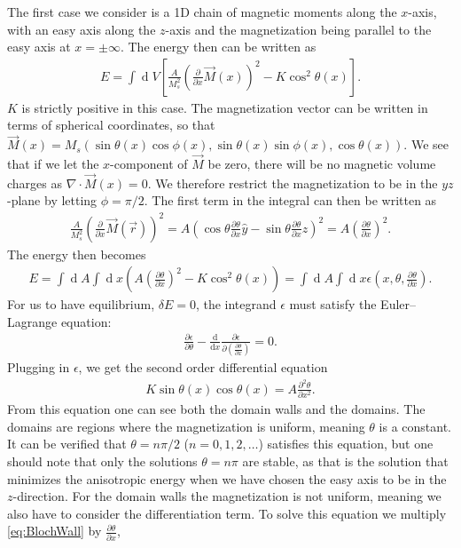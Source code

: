 \documentclass[12pt, a4paper, twoside, openright]{article}		%
\renewcommand{\d}[1]{\ensuremath{\operatorname{d}\!{#1}}}
\numberwithin{equation}{section}
\begin{document}
The first case we consider is a 1D chain of magnetic moments along the $x$-axis, with an easy axis along the $z$-axis and the magnetization being parallel to the easy axis at $x = \pm \infty$. The energy then can be written as
\begin{align}
\label{eq:BlochEnergy}
E = \int \d V \left[\frac{A}{M_s^2}\left(\frac{\partial}{\partial x}\vec{M}(x)\right)^2 - K \cos ^2 \theta (x)\right].
\end{align}
$K$ is strictly positive in this case. The magnetization vector can be written in terms of spherical coordinates, so that $\vec{M}(x) = M_s (\sin \theta (x) \cos \phi (x), \sin \theta (x) \sin \phi (x), \cos \theta (x))$. We see that if we let the $x$-component of $\vec{M}$ be zero, there will be no magnetic volume charges as $\nabla \cdot \vec{M}(x) = 0$. We therefore restrict the magnetization to be in the $yz$-plane by letting $\phi = \pi/2$. The first term in the integral can then be written as
\begin{align}
\frac{A}{M_s^2}\left(\frac{\partial}{\partial x}\vec{M}(\vec{r})\right)^2 = A\left(\cos\theta \frac{\partial \theta}{\partial x} \hat{y} - \sin\theta \frac{\partial \theta}{\partial x} \hat{z}\right)^2 = A \left(\frac{\partial \theta}{\partial x}\right)^2.
\end{align}
The energy then becomes
\begin{align}
E = \int \d A \int \d x \left(A \left(\frac{\partial \theta}{\partial x}\right)^2- K \cos ^2 \theta (x)\right) = \int \d A \int \d x \epsilon(x, \theta, \frac{\partial \theta}{\partial x}).
\end{align}
For us to have equilibrium, $\delta E = 0$, the integrand $\epsilon$ must satisfy the Euler--Lagrange equation:
\begin{align}
\frac{\partial \epsilon}{\partial \theta} - \frac{\textrm{d}}{\textrm{d} x} \frac{\partial \epsilon}{\partial (\frac{\partial \theta}{\partial x})} = 0.
\end{align}
Plugging in $\epsilon$, we get the second order differential equation
\begin{align}
\label{eq:BlochWall}
K\sin \theta (x) \cos \theta (x) = A \frac{\partial^2 \theta}{\partial x^2}.
\end{align} 
From this equation one can see both the domain walls and the domains. The domains are regions where the magnetization is uniform, meaning $\theta$ is a constant. It can be verified that $\theta = n\pi/2$ ($n = 0, 1, 2, \ldots$) satisfies this equation, but one should note that only the solutions $\theta = n\pi$ are stable, as that is the solution that minimizes the anisotropic energy when we have chosen the easy axis to be in the $z$-direction. For the domain walls the magnetization is not uniform, meaning we also have to consider the differentiation term. To solve this equation we multiply \eqref{eq:BlochWall} by $\frac{\partial \theta}{\partial x}$,
\end{document}
